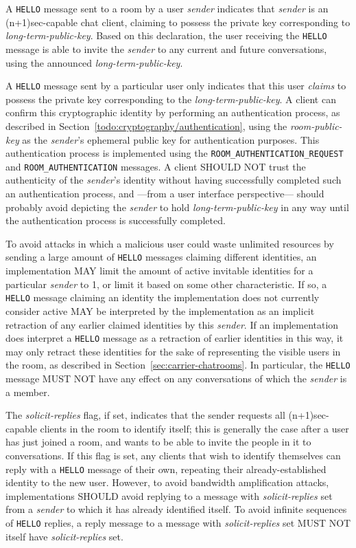 \documentclass{article}
\def\message#1{\texttt{#1}}
\def\field#1{\textit{#1}}
\begin{document}
A \message{HELLO} message sent to a room by a user \field{sender} indicates that \field{sender} is an (n+1)sec-capable chat client, claiming to possess the private key corresponding to \field{long-term-public-key}.
Based on this declaration, the user receiving the \message{HELLO} message is able to invite the \field{sender} to any current and future conversations, using the announced \field{long-term-public-key}.

A \message{HELLO} message sent by a particular user only indicates that this user \emph{claims} to possess the private key corresponding to the \field{long-term-public-key}.
A client can confirm this cryptographic identity by performing an authentication process, as described in Section~\ref{todo:cryptography/authentication}, using the \field{room-public-key} as the \field{sender}'s ephemeral public key for authentication purposes.
This authentication process is implemented using the \message{ROOM\_AUTHENTICATION\_REQUEST} and \message{ROOM\_AUTHENTICATION} messages.
A client SHOULD NOT trust the authenticity of the \field{sender}'s identity without having successfully completed such an authentication process, and ---from a user interface perspective--- should probably avoid depicting the \field{sender} to hold \field{long-term-public-key} in any way until the authentication process is successfully completed.

To avoid attacks in which a malicious user could waste unlimited resources by sending a large amount of \message{HELLO} messages claiming different identities, an implementation MAY limit the amount of active invitable identities for a particular \field{sender} to 1, or limit it based on some other characteristic.
If so, a \message{HELLO} message claiming an identity the implementation does not currently consider active MAY be interpreted by the implementation as an implicit retraction of any earlier claimed identities by this \field{sender}.
If an implementation does interpret a \message{HELLO} message as a retraction of earlier identities in this way, it may only retract these identities for the sake of representing the visible users in the room, as described in Section~\ref{sec:carrier-chatrooms}.
In particular, the \message{HELLO} message MUST NOT have any effect on any conversations of which the \field{sender} is a member.

The \field{solicit-replies} flag, if set, indicates that the sender requests all (n+1)sec-capable clients in the room to identify itself; this is generally the case after a user has just joined a room, and wants to be able to invite the people in it to conversations.
If this flag is set, any clients that wish to identify themselves can reply with a \message{HELLO} message of their own, repeating their already-established identity to the new user.
However, to avoid bandwidth amplification attacks, implementations SHOULD avoid replying to a message with \field{solicit-replies} set from a \field{sender} to which it has already identified itself.
To avoid infinite sequences of \message{HELLO} replies, a reply message to a message with \field{solicit-replies} set MUST NOT itself have \field{solicit-replies} set.
\end{document}
